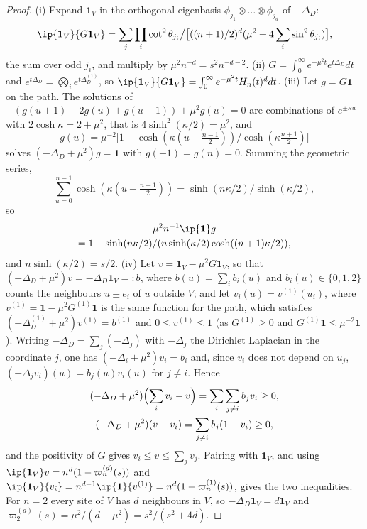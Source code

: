 \begin{proof}
(i) Expand $\mathbf 1_V$ in the orthogonal eigenbasis $\phi_{j_1}\otimes\dots
\otimes\phi_{j_d}$ of $-\Delta_D$:
\[
\ip{\mathbf 1_V}{G\mathbf 1_V}=\sum_j\prod_i
\cot^2\theta_{j_i}\big/\bigl[((n+1)/2)^d(\mu^2+4\sum_i\sin^2\theta_{j_i})\bigr],
\]
the sum over odd $j_i$, and multiply by $\mu^2n^{-d}=s^2n^{-d-2}$. (ii)
$G=\int_0^\infty e^{-\mu^2t}e^{t\Delta_D}dt$ and $e^{t\Delta_D}=\bigotimes_i
e^{t\Delta_D^{(1)}}$, so $\ip{\mathbf 1_V}{G\mathbf 1_V}=\int_0^\infty e^{-\mu^2
t}H_n(t)^ddt$. (iii) Let $g=G\mathbf 1$ on the path. The solutions of $-(g(u+1)
-2g(u)+g(u-1))+\mu^2g(u)=0$ are combinations of $e^{\pm\kappa u}$ with $2\cosh
\kappa=2+\mu^2$, that is $4\sinh^2(\kappa/2)=\mu^2$, and
\[
g(u)=\mu^{-2}\bigl[1-\cosh(\kappa(u-\tfrac{n-1}2))/\cosh(\kappa\tfrac{n+1}2)\bigr]
\]
solves $(-\Delta_D+\mu^2)g=\mathbf 1$ with $g(-1)=g(n)=0$. Summing the
geometric series,
\[
\sum_{u=0}^{n-1}\cosh(\kappa(u-\tfrac{n-1}2))=\sinh(n\kappa/2)/\sinh(\kappa/2),
\]
so
\begin{multline*}
\mu^2n^{-1}\ip{\mathbf 1}g\\
=1-\sinh(n\kappa/2)/(n\sinh(\kappa/2)\cosh((n+1)\kappa/2)),
\end{multline*}
and $n\sinh(\kappa/2)=s/2$. (iv) Let $v=\mathbf 1_V-\mu^2G\mathbf 1
_V$, so that $(-\Delta_D+\mu^2)v=-\Delta_D\mathbf 1_V=:b$, where $b(u)=\sum_ib_i
(u)$ and $b_i(u)\in\{0,1,2\}$ counts the neighbours $u\pm e_i$ of $u$ outside
$V$; and let $v_i(u)=v^{(1)}(u_i)$, where $v^{(1)}=\mathbf 1-\mu^2G^{(1)}\mathbf
1$ is the same function for the path, which satisfies $(-\Delta_D^{(1)}+\mu^2)
v^{(1)}=b^{(1)}$ and $0\le v^{(1)}\le1$ (as $G^{(1)}\ge0$ and $G^{(1)}\mathbf 1
\le\mu^{-2}\mathbf 1$). Writing $-\Delta_D=\sum_j(-\Delta_j)$ with $-\Delta_j$
the Dirichlet Laplacian in the coordinate $j$, one has $(-\Delta_i+\mu^2)v_i=
b_i$ and, since $v_i$ does not depend on $u_j$, $(-\Delta_jv_i)(u)=b_j(u)v_i(u)$
for $j\ne i$. Hence
\begin{gather*}
(-\Delta_D+\mu^2)\Bigl(\sum_iv_i-v\Bigr)=\sum_{i}\sum_{j\ne i}b_jv_i\ge0,
\\
(-\Delta_D+\mu^2)(v-v_i)=\sum_{j\ne i}b_j(1-v_i)\ge0,
\end{gather*}
and the positivity of $G$ gives $v_i\le v\le\sum_jv_j$. Pairing with $\mathbf 1
_V$, and using $\ip{\mathbf 1_V}v=n^d(1-\varpi_n^{(d)}(s))$ and $\ip{\mathbf 1_V}
{v_i}=n^{d-1}\ip{\mathbf 1}{v^{(1)}}=n^d(1-\varpi_n^{(1)}(s))$, gives the two
inequalities. For $n=2$ every site of $V$ has $d$ neighbours in $V$, so
$-\Delta_D\mathbf 1_V=d\mathbf 1_V$ and $\varpi_2^{(d)}(s)=\mu^2/(d+\mu^2)=s^2/
(s^2+4d)$.
\end{proof}

